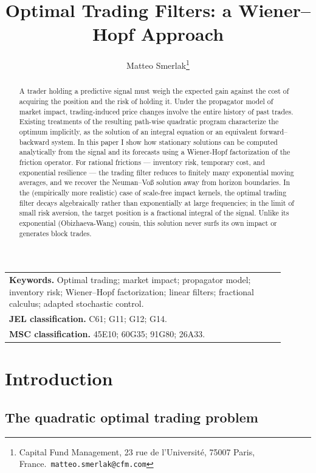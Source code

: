 \documentclass[11pt]{article}
\title{Optimal Trading Filters: a Wiener--Hopf Approach}
\author{Matteo Smerlak\thanks{Capital Fund Management, 23 rue de l'Universit\'e, 75007 Paris, France.\ \texttt{matteo.smerlak@cfm.com}}}
\date{}
\theoremstyle{plain}
\theoremstyle{definition}
\theoremstyle{remark}
\begin{document}
\maketitle

\begin{center}
\begin{tabular}{p{0.9\linewidth}}
\textbf{Keywords.} Optimal trading; market impact; propagator model; inventory risk; Wiener--Hopf factorization; linear filters; fractional calculus; adapted stochastic control.\\[2pt]
\textbf{JEL classification.} C61; G11; G12; G14.\\[2pt]
\textbf{MSC classification.} 45E10; 60G35; 91G80; 26A33.
\end{tabular}
\end{center}

\begin{abstract}
A trader holding a predictive signal must weigh the expected gain against the cost of acquiring the position and the risk of holding it. Under the propagator model of market impact, trading-induced price changes involve the entire history of past trades. Existing treatments of the resulting path-wise quadratic program characterize the optimum implicitly, as the solution of an integral equation or an equivalent forward--backward system. In this paper I show how stationary solutions can be computed analytically from the signal and its forecasts using a Wiener-Hopf factorization of the friction operator. For rational frictions --- inventory risk, temporary cost, and exponential resilience --- the trading filter reduces to finitely many exponential moving averages, and we recover the Neuman--Vo\ss{} solution away from horizon boundaries. In the (empirically more realistic) case of scale-free impact kernels, the optimal trading filter decays algebraically rather than exponentially at large frequencies; in the limit of small risk aversion, the target position is a fractional integral of the signal. Unlike its exponential (Obizhaeva-Wang) cousin, this solution never surfs its own impact or generates block trades.
\end{abstract}

\section{Introduction}\label{sec:intro}

\subsection{The quadratic optimal trading problem}\label{sec:problem}
\end{document}
